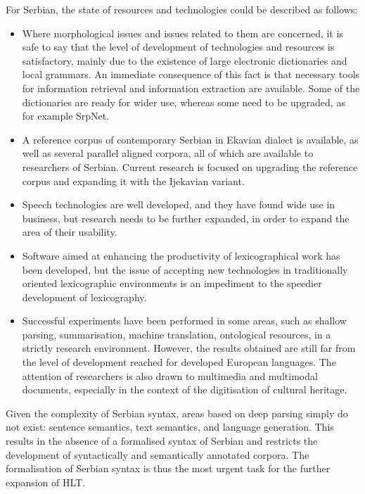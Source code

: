 \begin{multicols}{2}
For Serbian, the state of resources and technologies could be described as follows:
\begin{itemize}
\item Where morphological issues and issues related to them are concerned, it is safe to say that the level of development of technologies and resources is satisfactory, mainly due to the existence of large electronic dictionaries and local grammars. An immediate consequence of this fact is that necessary tools for information retrieval and information extraction are available. Some of the dictionaries are ready for wider use, whereas some need to be upgraded, as for example SrpNet.
\item A reference corpus of contemporary Serbian in Ekavian dialect is available, as well as several parallel aligned corpora, all of which are available to researchers of Serbian. Current research is focused on upgrading the reference corpus and expanding it with the Ijekavian variant.
\item Speech technologies are well developed, and they have found wide use in business, but research needs to be further expanded, in order to expand the area of their usability.
\item Software aimed at enhancing the productivity of lexicographical work has been developed, but the issue of accepting new technologies in traditionally oriented lexicographic environments is an impediment to the speedier development of lexicography.
\item Successful experiments have been performed in some areas, such as shallow parsing, summarisation, machine translation, ontological resources, in a strictly research environment. However, the results obtained are still far from the level of development reached for developed European languages. The attention of researchers is also drawn to multimedia and multimodal documents, especially in the context of the digitisation of cultural heritage.
\end{itemize}
Given the complexity of Serbian syntax, areas based on deep parsing simply do not exist: sentence semantics, text semantics, and language generation. This results in the absence of a formalised syntax of Serbian and restricts the development of syntactically and semantically annotated corpora. The formalisation of Serbian syntax is thus the most urgent task for the further expansion of HLT. 
 



\end{multicols}
